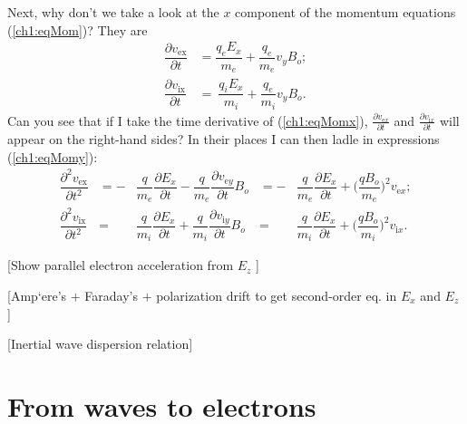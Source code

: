 Next, why don't we take a look at the $x$ component of the momentum equations
(\ref{ch1:eqMom})? They are
\begin{equation}
  \begin{aligned} \label{ch1:eqMomx} \dfrac{\partial v_{\textrm{ex}}}{\partial t} &= \dfrac{q_e E_x}{m_e} + \dfrac{q_e}{m_e}v_y B_o; \\
    \dfrac{\partial v_{\textrm{ix}}}{\partial t} &= ~ \dfrac{q_i E_x}{m_i} + \dfrac{q_e}{m_i}v_y B_o.
  \end{aligned}
\end{equation}
Can you see that if I take the time derivative of (\ref{ch1:eqMomx}),
$\frac{\partial v_{\textrm{e}x}}{\partial t}$ and $\frac{\partial
  v_{\textrm{i}x}}{\partial t}$ will appear on the right-hand sides? In their places I
can then ladle in expressions (\ref{ch1:eqMomy}):
\begin{equation}
\begin{alignedat}{5} \label{ch1:eqMomxdt} 
    \dfrac{\partial^2 v_{\textrm{ex}}}{\partial t^2} &= - &\dfrac{q}{m_e}\dfrac{\partial E_x}{\partial t} - \dfrac{q}{m_e}\dfrac{\partial v_{\textrm{e}y}}{\partial t} B_o &= -&\dfrac{q}{m_e}\dfrac{\partial E_x}{\partial t} + \big( \dfrac{q B_o}{m_e} \big )^2 v_{\textrm{e}x}; \\
    \dfrac{\partial^2 v_{\textrm{ix}}}{\partial t^2} &= &\dfrac{q}{m_i}\dfrac{\partial E_x}{\partial t} + \dfrac{q}{m_i}\dfrac{\partial v_{\textrm{i}y}}{\partial t} B_o &= &\dfrac{q}{m_i}\dfrac{\partial E_x}{\partial t} + \big( \dfrac{q B_o}{m_i} \big )^2 v_{\textrm{i}x}.
\end{alignedat}
\end{equation}

[Show parallel electron acceleration from $E_z$ ]

[Amp`{e}re's $+$ Faraday's $+$ polarization drift to get second-order eq. in $E_x$ and $E_z$ ]

[Inertial \Alf wave dispersion relation]

\section{From waves to electrons}

